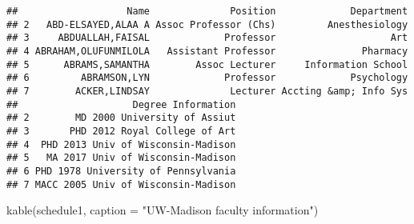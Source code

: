 \documentclass[
]{article}
\newenvironment{Shaded}{\begin{snugshade}}{\end{snugshade}}
\newcommand{\AttributeTok}[1]{\textcolor[rgb]{0.77,0.63,0.00}{#1}}
\newcommand{\FunctionTok}[1]{\textcolor[rgb]{0.00,0.00,0.00}{#1}}
\newcommand{\NormalTok}[1]{#1}
\newcommand{\StringTok}[1]{\textcolor[rgb]{0.31,0.60,0.02}{#1}}
\begin{document}
\begin{verbatim}
##                   Name              Position             Department
## 2   ABD-ELSAYED,ALAA A Assoc Professor (Chs)         Anesthesiology
## 3     ABDUALLAH,FAISAL             Professor                    Art
## 4 ABRAHAM,OLUFUNMILOLA   Assistant Professor               Pharmacy
## 5      ABRAMS,SAMANTHA        Assoc Lecturer     Information School
## 6         ABRAMSON,LYN             Professor             Psychology
## 7        ACKER,LINDSAY              Lecturer Accting &amp; Info Sys
##                    Degree Information
## 2        MD 2000 University of Assiut
## 3       PHD 2012 Royal College of Art
## 4  PHD 2013 Univ of Wisconsin-Madison
## 5   MA 2017 Univ of Wisconsin-Madison
## 6 PHD 1978 University of Pennsylvania
## 7 MACC 2005 Univ of Wisconsin-Madison
\end{verbatim}

\begin{Shaded}
\begin{Highlighting}[]
\FunctionTok{kable}\NormalTok{(schedule1, }\AttributeTok{caption =} \StringTok{"UW{-}Madison faculty information"}\NormalTok{)}
\end{Highlighting}
\end{Shaded}
\end{document}
